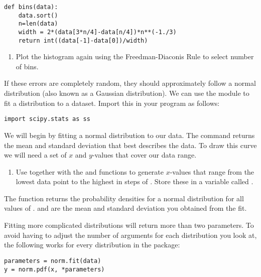 \documentclass{article}
\begin{document}
\begin{lstlisting}
def bins(data):
    data.sort()
    n=len(data)
    width = 2*(data[3*n/4]-data[n/4])*n**(-1./3)
    return int((data[-1]-data[0])/width)
\end{lstlisting}

\begin{enumerate}[resume]

    \item Plot the histogram again using the Freedman-Diaconis Rule to select number of bins.

\end{enumerate}

If these errors are completely random, they should approximately follow a normal distribution (also known as a Gaussian distribution).
We can use the module  to fit a distribution to a dataset. Import this in your program as follows:

\begin{lstlisting}
import scipy.stats as ss
\end{lstlisting}

We will begin by fitting a normal distribution to our data.
The command  returns the mean and standard deviation that best describes the data.
To draw this curve we will need a set of $x$ and $y$-values that cover our data range.

\begin{enumerate}[resume]

    \item Use  together with the  and  functions to generate $x$-values that range from the lowest data point to the highest in steps of . Store these in a variable called .

\end{enumerate}

The function  returns the probability densities for a normal distribution for all values of .
 and  are the mean and standard deviation you obtained from the fit.

Fitting more complicated distributions will return more than two parameters.
To avoid having to adjust the number of arguments for each distribution you look at, the following works for every distribution in the  package:

\begin{lstlisting}
parameters = norm.fit(data)
y = norm.pdf(x, *parameters)
\end{lstlisting}
\end{document}
